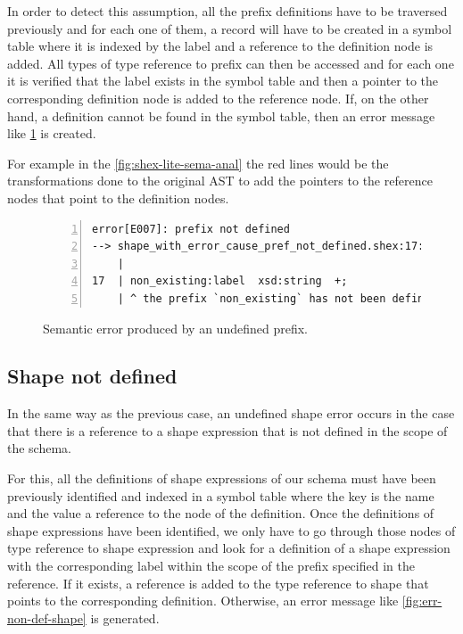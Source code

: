 In order to detect this assumption, all the prefix definitions have to be traversed previously and for each one of them,
a record will have to be created in a symbol table where it is indexed by the label and a reference to the definition node
is added. All types of type reference to prefix can then be accessed and for each one it is verified that the label exists
in the symbol table and then a pointer to the corresponding definition node is added to the reference node. If, on the other hand,
a definition cannot be found in the symbol table, then an error message like \cref{fig:err-non-def-pref} is created.

For example in the \cref{fig:shex-lite-sema-anal} the red lines would be the transformations done to the original AST to
add the pointers to the reference nodes that point to the definition nodes.

\begin{figure}
    \begin{lstlisting}[numbers=left,basicstyle=\ttfamily\scriptsize]
error[E007]: prefix not defined
--> shape_with_error_cause_pref_not_defined.shex:17:3
    |
17  | non_existing:label  xsd:string  +;
    | ^ the prefix `non_existing` has not been defined
    \end{lstlisting}
    \caption[Semantic error produced by an undefined prefix]{Semantic error produced by an undefined prefix.}
    \label{fig:err-non-def-pref}
\end{figure}

\subsection{Shape not defined}
In the same way as the previous case, an undefined shape error occurs in the case that there is a reference to a shape
expression that is not defined in the scope of the schema.

For this, all the definitions of shape expressions of our schema must have been previously identified and indexed in
a symbol table where the key is the name and the value a reference to the node of the definition. Once the definitions
of shape expressions have been identified, we only have to go through those nodes of type reference to shape expression
and look for a definition of a shape expression with the corresponding label within the scope of the prefix specified
in the reference. If it exists, a reference is added to the type reference to shape that points to the corresponding
definition. Otherwise, an error message like \cref{fig:err-non-def-shape} is generated.

